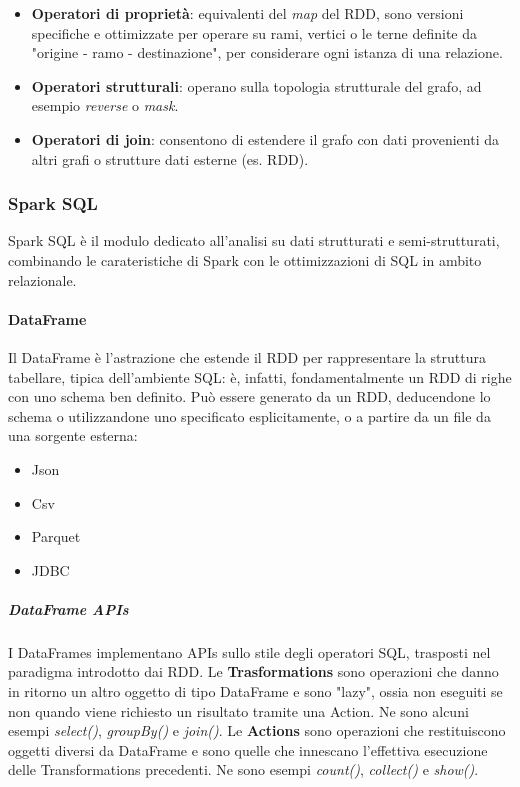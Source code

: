 \begin{itemize}
	\item \textbf{Operatori di proprietà}: equivalenti del \textit{map} del RDD, sono versioni specifiche e ottimizzate per operare su rami, vertici o le terne definite da "origine - ramo - destinazione", per considerare ogni istanza di una relazione.
	
	\item \textbf{Operatori strutturali}: operano sulla topologia strutturale del grafo, ad esempio \textit{reverse} o \textit{mask}.
	
	\item \textbf{Operatori di join}: consentono di estendere il grafo con dati provenienti da altri grafi o strutture dati esterne (es. RDD).
\end{itemize}

\subsubsection{Spark SQL}
Spark SQL \cite{spark_sql_doc} è il modulo dedicato all'analisi su dati strutturati e semi-strutturati, combinando le carateristiche di Spark con le ottimizzazioni di SQL in ambito relazionale.

\paragraph{DataFrame} Il DataFrame è l'astrazione che estende il RDD per rappresentare la struttura tabellare, tipica dell'ambiente SQL: è, infatti, fondamentalmente un RDD di righe con uno schema ben definito. Può essere generato da un RDD, deducendone lo schema o utilizzandone uno specificato esplicitamente, o a partire da un file da una sorgente esterna:

\begin{itemize}
	\item Json
	
	\item Csv
	
	\item Parquet
	
	\item JDBC
\end{itemize}

\subparagraph{DataFrame APIs}
I DataFrames implementano APIs sullo stile degli operatori SQL, trasposti nel paradigma introdotto dai RDD. Le \textbf{Trasformations} sono operazioni che danno in ritorno un altro oggetto di tipo DataFrame e sono "lazy", ossia non eseguiti se non quando viene richiesto un risultato tramite una Action. Ne sono alcuni esempi \textit{select()}, \textit{groupBy()} e \textit{join()}. Le \textbf{Actions} sono operazioni che restituiscono oggetti diversi da DataFrame e sono quelle che innescano l'effettiva esecuzione delle Transformations precedenti. Ne sono esempi \textit{count()}, \textit{collect()} e \textit{show()}.

